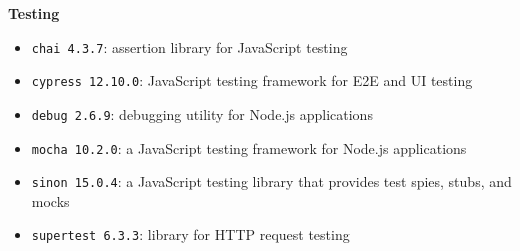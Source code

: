 \textbf{Testing}
\begin{itemize}
    \item \texttt{chai 4.3.7}: assertion library for JavaScript testing
    \item \texttt{cypress 12.10.0}: JavaScript testing framework for E2E and UI testing
    \item \texttt{debug 2.6.9}: debugging utility for Node.js applications
    \item \texttt{mocha 10.2.0}: a JavaScript testing framework for Node.js applications
    \item \texttt{sinon 15.0.4}: a JavaScript testing library that provides test spies, stubs, and mocks
    \item \texttt{supertest 6.3.3}: library for HTTP request testing\\
\end{itemize}

